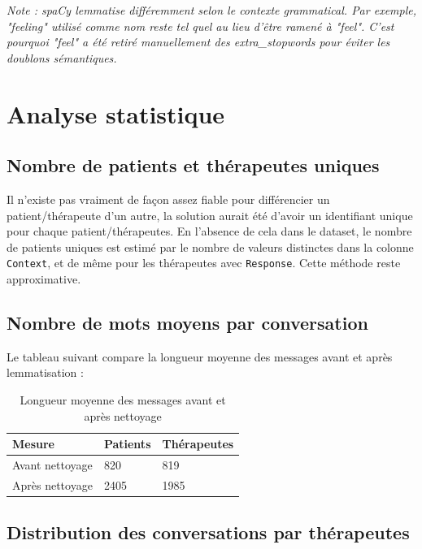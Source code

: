 \documentclass[12pt,a4paper]{article}
\begin{document}
\textit{Note : spaCy lemmatise différemment selon le contexte grammatical. Par exemple,
\textit{"feeling"} utilisé comme nom reste tel quel au lieu d'être ramené à \textit{"feel"}.
C'est pourquoi \textit{"feel"} a été retiré manuellement des extra\_stopwords pour éviter
les doublons sémantiques.}

\pagebreak

\section{Analyse statistique}
\label{sec:analyse_statistique}

\subsection{Nombre de patients et thérapeutes uniques}
\label{sec:nbPatientsTherapeutes}

Il n'existe pas vraiment de façon assez fiable pour différencier un patient/thérapeute d'un autre, 
la solution aurait été d'avoir un identifiant unique pour chaque patient/thérapeutes.
En l'absence de cela dans le dataset, le nombre de patients uniques est estimé
par le nombre de valeurs distinctes dans la colonne \texttt{Context}, et de même pour les
thérapeutes avec \texttt{Response}. Cette méthode reste approximative.

\subsection{Nombre de mots moyens par conversation}

Le tableau suivant compare la longueur moyenne des messages avant et après lemmatisation :

\begin{table}[h]
\centering
\begin{tabularx}{0.60\textwidth}{lXX}
\toprule
\textbf{Mesure} & \textbf{Patients} & \textbf{Thérapeutes} \\
\midrule
Avant nettoyage      & 820 & 819 \\
Après nettoyage      & 2405 & 1985 \\
\bottomrule
\end{tabularx}
\caption{Longueur moyenne des messages avant et après nettoyage}
\end{table}

\subsection{Distribution des conversations par thérapeutes}
\end{document}

